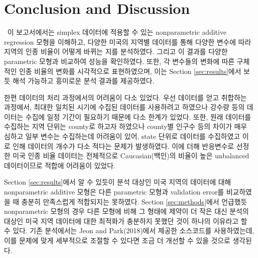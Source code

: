 \section{Conclusion and Discussion}\label{sec:conclusion}

\ \quad 이 보고서에서는 simplex 데이터에 적용할 수 있는 nonparametric additive regression 모형을 이해하고, 다양한 미국의 지역별 데이터를 통해 다양한 변수에 따라 지역의 인종 비율이 어떻게 바뀌는 지를 분석하였다. 그리고 이 결과를 다양한 parametric 모형과 비교하여 성능을 확인하였다. 또한, 각 변수들의 변화에 따른 구체적인 인종 비율의 변화를 시각적으로 표현하였으며, 이는 Section \ref{sec:results}에서 보듯 해석 가능하고 흥미로운 분석 결과를 제공하였다.

한편 데이터의 처리 과정에서의 어려움이 다소 있었다. 우선 데이터를 얻고 취합하는 과정에서, 최대한 일치된 시기에 수집된 데이터를 사용하려고 하였으나 강수량 등의 데이터는 수집에 일정 기간이 필요하기 때문에 다소 한계가 있었다. 또한, 원래 데이터를 수집하는 지역 단위는 county로 하고자 하였으나 county별 인구수 등의 차이가 매우 심하고 일부 변수는 수집하는데 어려움이 있어, state 단위로 데이터를 수집하였고 이로 인해 데이터의 개수가 다소 적다는 문제가 발생하였다. 이에 더해 반응변수로 선정한 미국 인종 비율 데이터는 전체적으로 Caucasian(백인)의 비율이 높은 unbalanced 데이터이므로 적합에 어려움이 있었다.

Section \ref{sec:results}에서 알 수 있듯이 분석 대상인 미국 지역의 데이터에 대해 nonparametric additive 모형은 다른 parametric 모형과 validation error를 비교하였을 때 충분히 만족스럽게 적합되지는 못하였다. Section \ref{sec:methods}에서 언급했듯 nonparametric 모형의 경우 다른 모형에 비해 그 형태에 제약이 더 작은 대신 분석의 대상인 미국 지역 데이터에 대한 최적화가 충분하지 못했던 것이 하나의 이유라고 할 수 있다. 기존 분석에서는 Jeon and Park(2018)에서 제공한 소스코드를 사용하였는데, 이를 문제에 맞게 세부적으로 조절할 수 있다면 조금 더 개선할 수 있을 것으로 생각된다. 

